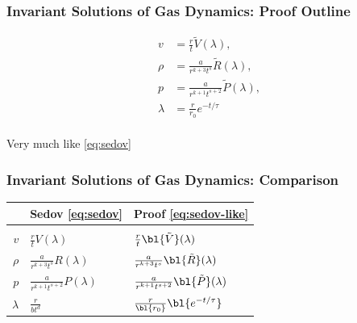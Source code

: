 %
%
\begin{frame}\frametitle{Invariant Solutions of Gas Dynamics: Proof Outline}
\begin{equation}
\begin{split}
	v &= \frac{r}{t}		\tilde{V}(\lambda), \\
	\rho &= \frac{a}{r^{k+3}t^{s}}	\tilde{R}(\lambda), \\
	p &= \frac{a}{r^{k+1}t^{s+2}}	\tilde{P}(\lambda), \\
	\lambda &= \frac{r}{r_{0}}e^{-t/\tau}
\end{split}
\label{eq:sedov-like}
\end{equation}
\ \\
Very much like \eqref{eq:sedov}
\end{frame}

%
\begin{frame}\frametitle{Invariant Solutions of Gas Dynamics: Comparison}
\begin{table}[htp]
\begin{center}
\begin{tabular}{rll}
	& Sedov \eqref{eq:sedov} & Proof \eqref{eq:sedov-like} \\\hline
	\\[-9pt]
	$v$ 			& $\frac{r}{t} V (\lambda)$ 				&  $\frac{r}{t} \bl{\tilde{V}} (\lambda)$ \\[5pt]
	$\rho$ 		& $\frac{a}{r^{k+3}t^{s}} R (\lambda)$	& $\frac{a}{r^{k+3}t^{s}} \bl{\tilde{R}} (\lambda)$ \\[5pt]
	$p$ 			& $\frac{a}{r^{k+1}t^{s+2}} P(\lambda)$	& $\frac{a}{r^{k+1}t^{s+2}} \bl{\tilde{P}}(\lambda)$ \\[5pt]
	$\lambda$ 	& $\frac{r}{b t^{d}}$					& $\frac{r}{\bl{r_{0}}}\bl{e^{-t/\tau}}$
\end{tabular}
\end{center}
\label{tab:proof-compare}
\end{table}%
\end{frame}
%


\endinput  %

